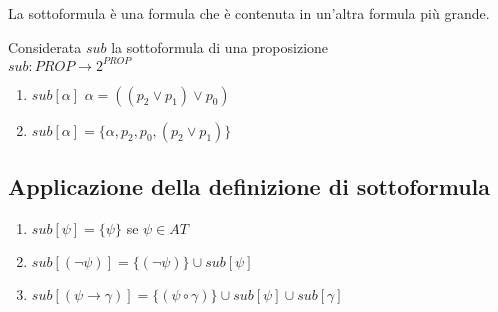 \documentclass{article}
\theoremstyle{break}
\theoremstyle{break}
\theoremstyle{break}
\theoremstyle{break}
\begin{document}
La sottoformula è una formula che è contenuta in un'altra formula più grande.
\begin{definition}
	Considerata \( sub \) la sottoformula di una proposizione\\
	\( sub: PROP \to 2^{PROP} \)
	\begin{enumerate}
		\item \( sub[\alpha] \) \( \alpha = ((p_{2} \vee p_{1}) \vee p_{0} ) \)
		\item \( sub[\alpha] = \{\alpha, p_2, p_0, (p_2 \vee p_1)\} \)
	\end{enumerate}
\end{definition}

\subsection{Applicazione della definizione di sottoformula}
\begin{enumerate}
	\item \( sub[\psi] = \{ \psi \} \) se \( \psi \in AT \)
	\item \( sub[(\neg \psi)] = \{ (\neg \psi) \} \cup sub[\psi] \)
	\item \( sub[(\psi \to \gamma)] = \{(\psi \circ \gamma)\} \cup sub[\psi] \cup sub[\gamma] \)
\end{enumerate}
\end{document}
